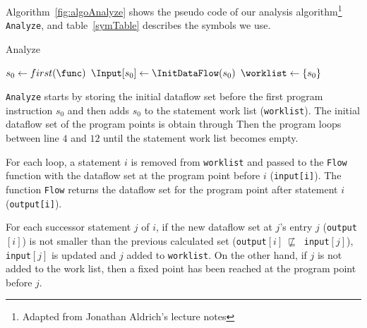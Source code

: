 Algorithm~\ref{fig:algoAnalyze} shows the pseudo code of our
analysis algorithm\footnote{Adapted from Jonathan Aldrich's
lecture notes} \texttt{Analyze}, and table~\ref{symTable}
describes the symbols we use.

\begin{algorithm}
\caption{Analyze}\label{fig:algoAnalyze}
\SetAlgoLined
\LinesNumbered
\DontPrintSemicolon
{}


$ s_0 \leftarrow first(\func)$\;
$\Input[s_0] \leftarrow \InitDataFlow(s_0)$\;
$\worklist \leftarrow \set{s_0}$\;
\While{ $\worklist\ !=\ \emptyset$ }{
	$\varI \leftarrow \Next(\worklist)$\;
	$\Output[i] = \Flow(\varI, \Input[\varI])$\;
	\ForEach{ $\varJ \in \Succs(\varI)$ }{
		\If{ $\Output[\varI] \not\sqsubseteq \Input[\varJ]$}{
			$\Input[\varJ] = \Input[\varJ] \sqcup \Output[\varI]$\;
			$\worklist = \worklist \cup\ \set{\varJ}$\;
		}	
	}
}
\end{algorithm}
\DecMargin{1em}

\texttt{Analyze} starts by storing the initial dataflow
set before the first program instruction $s_0$ and then
adds $s_0$ to the statement work list (\texttt{worklist}).
The initial dataflow set of the program points is obtain
through 
Then the program loops between line $4$ and $12$ until
the statement work list becomes empty.

For each loop, a statement $i$ is removed from
\texttt{worklist} and passed to the \texttt{Flow} function
with the dataflow set at the program point before $i$ (\texttt{input[i]}).
The function \texttt{Flow} returns the dataflow set for
the program point after statement $i$ (\texttt{output[i]}).

For each successor statement $j$ of $i$, if the new
dataflow set at $j$'s entry $j$ (\texttt{output}$[i]$)
is not smaller than the previous calculated set
(\texttt{output}$[i]\ \not\sqsubseteq\ $ \texttt{input}$[j]$),
\texttt{input}$[j]$ is updated and $j$ added to \texttt{worklist}.
On the other hand, if $j$ is not added to the work list, then
a fixed point has been reached at the program point before $j$.

